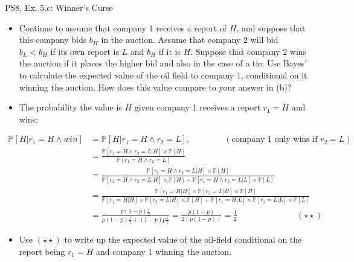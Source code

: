 \begin{frame}{PS8, Ex. 5.c: Winner's Curse}
      \begin{itemize}
        \item[(c)] Continue to assume that company 1 receives a report of $H$, and suppose that this company bids $b_H$ in the auction. Assume that company 2 will bid $b_L < b_H$ if its own report is $L$ and $b_H$ if it is $H$. Suppose that company 2 wins the auction if it places the higher bid and also in the case of a tie. Use Bayes’ to calculate the expected value of the oil field to company 1, conditional on it winning the auction. How does this value compare to your answer in (b)?
        \item[Step 1:] The probability the value is $H$ given company 1 receives a report $r_1=H$ and wins:
        \end{itemize}
        \vspace{-12pt}
        \begin{align*}
            \mathbb{P}[H|r_1=H\wedge win]&=\mathbb{P}[H|r_1=H\wedge r_2=L],\quad\quad\quad\quad(\text{company 1 only wins if }r_2=L)\\
            &=\frac{\mathbb{P}[r_1=H\wedge r_2=L|H]\times\mathbb{P}[H]}{\mathbb{P}[r_1=H\wedge r_2=L]}&\\
            &=\frac{\mathbb{P}[r_1=H\wedge r_2=L|H]\times\mathbb{P}[H]}{\mathbb{P}[r_1=H\wedge r_2=L|H]\times\mathbb{P}[H]+\mathbb{P}[r_1=H\wedge r_2=L|L]\times\mathbb{P}[L]}&\\
            &=\frac{\mathbb{P}[r_1=H|H]\times\mathbb{P}[r_2=L|H]\times\mathbb{P}[H]}{\mathbb{P}[r_1=H|H]\times\mathbb{P}[r_2=L|H]\times\mathbb{P}[H]+\mathbb{P}[r_1=H|L]\times\mathbb{P}[r_2=L|L]\times\mathbb{P}[L]}&\\
            &=\frac{p(1-p)\frac{1}{2}}{p(1-p)\frac{1}{2}+(1-p)p\frac{1}{2}}=\frac{p(1-p)}{2(p(1-p))}=\frac{1}{2}\quad\quad\quad\quad\quad\quad\quad(\star\star)
        \end{align*}
        \vspace{-12pt}
        \begin{itemize}
        \item[Step 2:] Use $(\star\star)$ to write up the expected value of the oil-field conditional on the report being $r_1=H$ and company 1 winning the auction.
      \end{itemize}
      \vfill\null
\end{frame}
